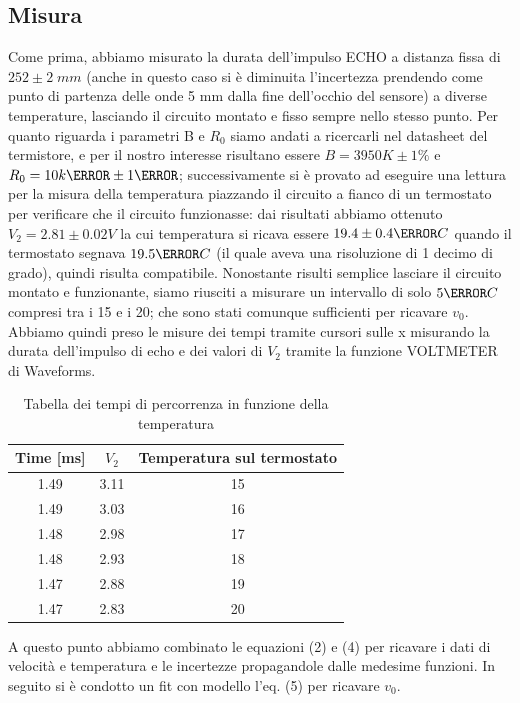 \documentclass[10pt, a4paper, italian]{article}
\begin{document}
\subsection{Misura}
Come prima, abbiamo misurato la durata dell'impulso ECHO a distanza fissa di $252 \pm 2 \; mm$ (anche in questo caso si è diminuita l'incertezza prendendo come punto di partenza delle onde 5 mm dalla fine dell'occhio del sensore) a diverse temperature, lasciando il circuito montato e fisso sempre nello stesso punto.
Per quanto riguarda i parametri B e $R_0$ siamo andati a ricercarli nel datasheet del termistore, e per il nostro interesse risultano essere $B=3950 K \pm 1 \percent$ e $R_0 = 10 k\ohm \pm 1 \percent$; successivamente si è provato ad eseguire una lettura per la misura della temperatura piazzando il circuito a fianco di un termostato per verificare che il circuito funzionasse: dai risultati abbiamo ottenuto $V_2=2.81 \pm 0.02 V$ la cui temperatura si ricava essere $19.4 \pm 0.4 \degree C$ quando il termostato segnava $19.5  \degree C$ (il quale aveva una risoluzione di 1 decimo di grado), quindi risulta compatibile.
Nonostante risulti semplice lasciare il circuito montato e funzionante, siamo riusciti a misurare un intervallo di solo $5 \degree C$ compresi tra i 15 e i 20; che sono stati comunque sufficienti per ricavare $v_0$. Abbiamo quindi preso le misure dei tempi tramite cursori sulle x misurando la durata dell'impulso di echo e dei valori di $V_2$ tramite la funzione VOLTMETER di Waveforms.
\begin{table}[htbp]
\centering
\begin{tabular}{ccc}
\toprule
Time [ms] & $V_2$ & Temperatura sul termostato \\
\midrule
\midrule
1.49 & 3.11 & 15 \\
1.49 & 3.03 & 16 \\
1.48 & 2.98 & 17 \\
1.48 & 2.93 & 18 \\
1.47 & 2.88 & 19 \\
1.47 & 2.83 & 20 \\
\bottomrule
\end{tabular}
\caption{Tabella dei tempi di percorrenza in funzione della temperatura}
\end{table}
A questo punto abbiamo combinato le equazioni (2) e (4) per ricavare i dati di velocità e temperatura e le incertezze propagandole dalle medesime funzioni. In seguito si è condotto un fit con modello l'eq. (5) per ricavare $v_0$.
\end{document}
